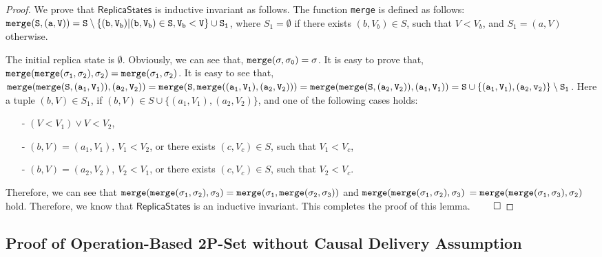 \begin {proof}
We prove that $\mathsf{ReplicaStates}$ is inductive invariant as follows. The function {\tt merge} is defined as follows: $\alabelshort[{\tt merge}]{S,(a,V)} = S \setminus \{ (b,V_b) \vert (b,V_b) \in S, V_b < V \} \cup S_1$, where $S_1 = \emptyset$ if there exists $(b,V_b) \in S$, such that $V < V_b$, and $S_1 = (a,V)$ otherwise.

The initial replica state is $\emptyset$. Obviously, we can see that, $\alabelshort[{\tt merge}]{\astate,\astate_0} = \astate$. It is easy to prove that, $\alabelshort[{\tt merge}]{\alabelshort[{\tt merge}]{\astate_1,\astate_2},\astate_2} = \alabelshort[{\tt merge}]{\astate_1,\astate_2}$. It is easy to see that, $\alabelshort[{\tt merge}]{\alabelshort[{\tt merge}]{S,(a_1,V_1)},(a_2,V_2)} = \alabelshort[{\tt merge}]{S, \alabelshort[{\tt merge}]{(a_1,V_1),(a_2,V_2)}} = \alabelshort[{\tt merge}]{\alabelshort[{\tt merge}]{S,(a_2,V_2)},(a_1,V_1)} = S \cup \{ (a_1,V_1),(a_2,v_2) \} \setminus S_1$. Here a tuple $(b,V) \in S_1$, if $(b,V) \in S \cup \{ (a_1,V_1),(a_2,V_2) \}$, and one of the following cases holds:

\begin{itemize}
\setlength{\itemsep}{0.5pt}
\item[-] $(V < V_1) \vee V < V_2$,

\item[-] $(b,V) = (a_1,V_1)$, $V_1 < V_2$, or there exists $(c,V_c) \in S$, such that $V_1 < V_c$,

\item[-] $(b,V) = (a_2,V_2)$, $V_2 < V_1$, or there exists $(c,V_c) \in S$, such that $V_2 < V_c$.
\end{itemize}

Therefore, we can see that $\alabelshort[{\tt merge}]{\alabelshort[{\tt merge}]{\astate_1,\astate_2},\astate_3} = \alabelshort[{\tt merge}]{\astate_1, \alabelshort[{\tt merge}]{\astate_2,\astate_3}}$ and $\alabelshort[{\tt merge}]{\alabelshort[{\tt merge}]{\astate_1,\astate_2},\astate_3}$ $= \alabelshort[{\tt merge}]{\alabelshort[{\tt merge}]{\astate_1,\astate_3},\astate_2}$ hold. Therefore, we know that $\mathsf{ReplicaStates}$ is an inductive invariant. This completes the proof of this lemma. $\qed$
\end {proof}






\subsection{Proof of Operation-Based 2P-Set without Causal Delivery Assumption}
\label{subsec:proof of operation-based 2p-set without causal delivery assumption}


